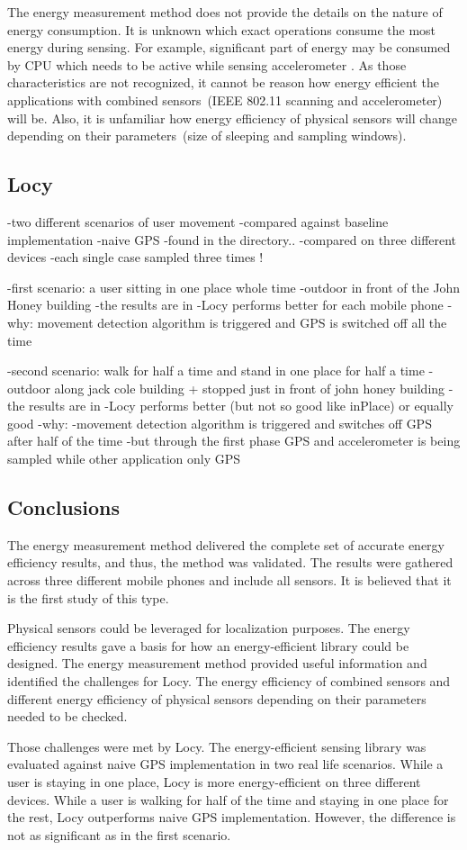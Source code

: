 The energy measurement method does not provide the details on the nature of energy consumption. It is unknown which exact operations consume the most energy during sensing. For example, significant part of energy may be consumed by CPU which needs to be active while sensing accelerometer \cite{priyantha:littlerock}. As those characteristics are not recognized, it cannot be reason how energy efficient the applications with combined sensors\ (IEEE 802.11 scanning and accelerometer) will be. Also, it is unfamiliar how energy efficiency of physical sensors will change depending on their parameters\ (size of sleeping and sampling windows).
						
\subsection{Locy}
-two different scenarios of user movement 
-compared against baseline implementation
	-naive GPS
	-found in the directory..
-compared on three different devices
-each single case sampled three times !

-first scenario: a user sitting in one place whole time
	-outdoor in front of the John Honey building
-the results are in 
-Locy performs better for each mobile phone
-why:
	movement detection algorithm is triggered and GPS is switched off all the time

-second scenario: walk for half a time and stand in one place for half a time 
	-outdoor along jack cole building + stopped just in front of john honey building
-the results are in 
-Locy performs better (but not so good like inPlace) or equally good
-why:
	-movement detection algorithm is triggered and switches off GPS after half of the time
	-but through the first phase GPS and accelerometer is being sampled while other application only GPS	

\subsection{Conclusions}
The energy measurement method delivered the complete set of accurate energy efficiency results, and thus, the method was validated. The results were gathered across three different mobile phones and include all sensors. It is believed that it is the first study of this type. 

Physical sensors could be leveraged for localization purposes. The energy efficiency results gave a basis for how an energy-efficient library could be designed. The energy measurement method provided useful information and identified the challenges for Locy. The energy efficiency of combined sensors and different energy efficiency of physical sensors depending on their parameters needed to be checked. 

Those challenges were met by Locy. The energy-efficient sensing library was evaluated against naive GPS  implementation in two real life scenarios. While a user is staying in one place, Locy is more energy-efficient on three different devices. While a user is walking for half of the time and staying in one place for the rest, Locy outperforms naive GPS implementation. However, the difference is not as significant as in the first scenario.